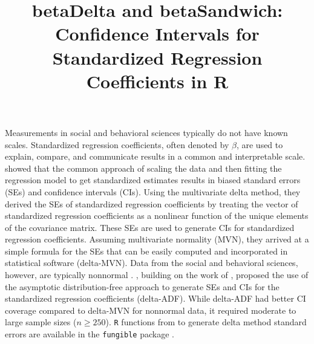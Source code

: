 \documentclass[man]{apa7}\usepackage[]{graphicx}\usepackage[]{xcolor}
\title{betaDelta and betaSandwich: Confidence Intervals for Standardized Regression Coefficients in R}
\begin{document}
\maketitle

Measurements in social and behavioral sciences typically do not have known scales.
Standardized regression coefficients,
often denoted by $\beta$,
are used to explain,
compare,
and communicate results in a common and interpretable scale.
\Textcite{Lib-Regression-Standardized-Coefficients-Delta-Yuan-2011}
showed that the common approach
of scaling the data
and then fitting the regression model to get standardized estimates
results in biased standard errors (SEs)
and confidence intervals (CIs).
Using the multivariate delta method,
they derived the SEs
of standardized regression coefficients
by treating the vector of standardized regression coefficients
as a nonlinear function of the unique elements of the covariance matrix.
These SEs are used to generate CIs for standardized regression coefficients.
Assuming multivariate normality (MVN),
they arrived at a simple formula for the SEs that can be easily computed
and incorporated in statistical software
(delta-MVN).
Data from the social and behavioral sciences,
however,
are typically nonnormal
\parencite{Lib-Nonnormality-Micceri-1989}.
\Textcite{Lib-Regression-Standardized-Coefficients-Delta-Jones-2015},
building on the work of
\Textcite{Lib-Regression-Standardized-Coefficients-Delta-Yuan-2011},
proposed the use of the asymptotic distribution-free
\parencite[ADF:][]{Lib-Structural-Equation-Modeling-ADF-Browne-1984}
approach
to generate SEs and CIs for the standardized regression coefficients
(delta-ADF).
While delta-ADF had better CI coverage compared to delta-MVN for nonnormal data,
it required moderate to large sample sizes ($n \geq 250$).
\texttt{R} functions from \Textcite{Lib-Regression-Standardized-Coefficients-Delta-Jones-2015} to generate delta method standard errors are available in the \texttt{fungible} package \parencite{Lib-R-Packages-fungible-2022}.
\end{document}
